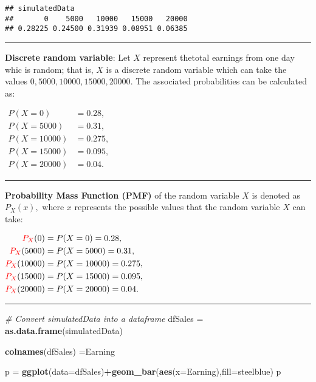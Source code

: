 \documentclass[
]{article}
\newenvironment{Shaded}{\begin{snugshade}}{\end{snugshade}}
\newcommand{\AttributeTok}[1]{\textcolor[rgb]{0.13,0.29,0.53}{#1}}
\newcommand{\CommentTok}[1]{\textcolor[rgb]{0.56,0.35,0.01}{\textit{#1}}}
\newcommand{\FunctionTok}[1]{\textcolor[rgb]{0.13,0.29,0.53}{\textbf{#1}}}
\newcommand{\NormalTok}[1]{#1}
\newcommand{\OtherTok}[1]{\textcolor[rgb]{0.56,0.35,0.01}{#1}}
\newcommand{\SpecialCharTok}[1]{\textcolor[rgb]{0.81,0.36,0.00}{\textbf{#1}}}
\newcommand{\StringTok}[1]{\textcolor[rgb]{0.31,0.60,0.02}{#1}}
\begin{document}
\begin{verbatim}
## simulatedData
##       0    5000   10000   15000   20000 
## 0.28225 0.24500 0.31939 0.08951 0.06385
\end{verbatim}

\begin{center}\rule{0.5\linewidth}{0.5pt}\end{center}

\textbf{Discrete random variable}: Let \(X\) represent thetotal earnings
from one day whic is random; that is, \(X\) is a discrete random
variable which can take the values \(0, 5000, 10000, 15000, 20000.\) The
associated probabilities can be calculated as:

\(\begin{align*}P(X = 0) &= 0.28,\\ P(X = 5000) &= 0.31,\\ P(X = 10000) &= 0.275,\\ P(X = 15000) &= 0.095,\\ P(X = 20000) &= 0.04.\end{align*}\)

\begin{center}\rule{0.5\linewidth}{0.5pt}\end{center}

\textbf{Probability Mass Function (PMF)} of the random variable \(X\) is
denoted as \(P_X(x),\) where \(x\) represents the possible values that
the random variable \(X\) can take:

\(\begin{align*}{\color{red}{P_X}}(0) &= P(X = 0) = 0.28,\\ {\color{red}{P_X}}(5000) &=P(X = 5000) = 0.31,\\ {\color{red}{P_X}}(10000) &=P(X = 10000) = 0.275,\\ {\color{red}{P_X}}(15000) &=P(X = 15000) = 0.095,\\ {\color{red}{P_X}}(20000) &=P(X = 20000) = 0.04.\end{align*}\)

\begin{center}\rule{0.5\linewidth}{0.5pt}\end{center}

\begin{Shaded}
\begin{Highlighting}[]
\CommentTok{\# Convert simulatedData into a dataframe}
\NormalTok{dfSales }\OtherTok{=} \FunctionTok{as.data.frame}\NormalTok{(simulatedData)}


\FunctionTok{colnames}\NormalTok{(dfSales) }\OtherTok{=}\StringTok{\textquotesingle{}Earning\textquotesingle{}}


\NormalTok{p }\OtherTok{=} \FunctionTok{ggplot}\NormalTok{(}\AttributeTok{data=}\NormalTok{dfSales)}\SpecialCharTok{+}\FunctionTok{geom\_bar}\NormalTok{(}\FunctionTok{aes}\NormalTok{(}\AttributeTok{x=}\NormalTok{Earning),}\AttributeTok{fill=}\StringTok{\textquotesingle{}steelblue\textquotesingle{}}\NormalTok{)}
\NormalTok{p}
\end{Highlighting}
\end{Shaded}
\end{document}
